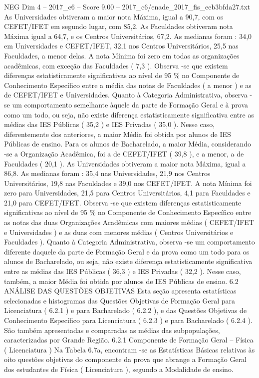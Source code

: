 \begin{textsample}{NEG Dim 4 – 2017\_c6 – Score 9.00 – 2017\_c6/enade\_2017\_fis\_eeb3bfda27.txt}
As Universidades obtiveram a maior nota Máxima, igual a 90,7, com os CEFET/IFET em segundo lugar, com 85,2.
As Faculdades obtiveram nota Máxima igual a 64,7, e os Centros Universitários, 67,2.
As medianas foram : 34,0 em Universidades e CEFET/IFET, 32,1 nos Centros Universitários, 25,5 nas Faculdades, a menor delas.
A nota Mínima foi zero em todas as organizações acadêmicas, com exceção das Faculdades ( 7,3 ).
Observa -se que existem diferenças estatisticamente significativas ao nível de 95 \% no Componente de Conhecimento Específico entre a média das notas de Faculdades ( a menor ) e as de CEFET/IFET e Universidades.
Quanto à Categoria Administrativa, observa -se um comportamento semelhante àquele da parte de Formação Geral e à prova como um todo, ou seja, não existe diferença estatisticamente significativa entre as médias das IES Públicas ( 35,2 ) e IES Privadas ( 35,0 ).
Nesse caso, diferentemente dos anteriores, a maior Média foi obtida por alunos de IES Públicas de ensino.
Para os alunos de Bacharelado, a maior Média, considerando -se a Organização Acadêmica, foi a de CEFET/IFET ( 39,8 ), e a menor, a de Faculdades ( 20,1 ).
As Universidades obtiveram a maior nota Máxima, igual a 86,8.
As medianas foram : 35,4 nas Universidades, 21,9 nos Centros Universitários, 19,8 nas Faculdades e 39,0 nos CEFET/IFET.
A nota Mínima foi zero para Universidades, 21,5 para Centros Universitários, 4,1 para Faculdades e 21,0 para CEFET/IFET.
Observa -se que existem diferenças estatisticamente significativas ao nível de 95 \% no Componente de Conhecimento Específico entre as notas das duas Organizações Acadêmicas com maiores médias ( CEFET/IFET e Universidades ) e as duas com menores médias ( Centros Universitários e Faculdades ).
Quanto à Categoria Administrativa, observa -se um comportamento diferente daquele da parte de Formação Geral e da prova como um todo para os alunos de Bacharelado, ou seja, não existe diferença estatisticamente significativa entre as médias das IES Públicas ( 36,3 ) e IES Privadas ( 32,2 ).
Nesse caso, também, a maior Média foi obtida por alunos de IES Públicas de ensino. 6.2 ANÁLISE DAS QUESTÕES OBJETIVAS Esta seção apresenta estatísticas selecionadas e histogramas das Questões Objetivas de Formação Geral para Licenciatura ( 6.2.1 ) e para Bacharelado ( 6.2.2 ), e das Questões Objetivas de Conhecimento Específico para Licenciatura ( 6.2.3 ) e para Bacharelado ( 6.2.4 ).
São também apresentadas e comparadas as médias das subpopulações, caracterizadas por Grande Região. 6.2.1 Componente de Formação Geral – Física ( Licenciatura ) Na Tabela 6.7a, encontram -se as Estatísticas Básicas relativas às oito questões objetivas do componente da prova que abrange a Formação Geral dos estudantes de Física ( Licenciatura ), segundo a Modalidade de ensino.

\end{textsample}
